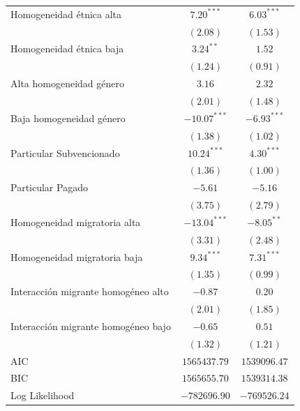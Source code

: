 \documentclass[
]{article}
\begin{document}
\begin{table}
\begin{center}
\begin{tabular}{l c c}
Homogeneidad étnica alta            & $7.20^{***}$   & $6.03^{***}$   \\
                                    & $(2.08)$       & $(1.53)$       \\
Homogeneidad étnica baja            & $3.24^{**}$    & $1.52$         \\
                                    & $(1.24)$       & $(0.91)$       \\
Alta homogeneidad género            & $3.16$         & $2.32$         \\
                                    & $(2.01)$       & $(1.48)$       \\
Baja homogeneidad género            & $-10.07^{***}$ & $-6.93^{***}$  \\
                                    & $(1.38)$       & $(1.02)$       \\
Particular Subvencionado            & $10.24^{***}$  & $4.30^{***}$   \\
                                    & $(1.36)$       & $(1.00)$       \\
Particular Pagado                   & $-5.61$        & $-5.16$        \\
                                    & $(3.75)$       & $(2.79)$       \\
Homogeneidad migratoria alta        & $-13.04^{***}$ & $-8.05^{**}$   \\
                                    & $(3.31)$       & $(2.48)$       \\
Homogeneidad migratoria baja        & $9.34^{***}$   & $7.31^{***}$   \\
                                    & $(1.35)$       & $(0.99)$       \\
Interacción migrante homogéneo alto & $-0.87$        & $0.20$         \\
                                    & $(2.01)$       & $(1.85)$       \\
Interacción migrante homogéneo bajo & $-0.65$        & $0.51$         \\
                                    & $(1.32)$       & $(1.21)$       \\
\hline
AIC                                 & $1565437.79$   & $1539096.47$   \\
BIC                                 & $1565655.70$   & $1539314.38$   \\
Log Likelihood                      & $-782696.90$   & $-769526.24$   \\

\end{tabular}
\end{center}
\end{table}
\end{document}
